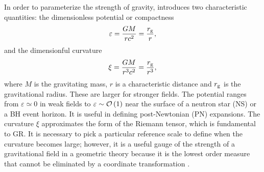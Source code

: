 In order to parameterize the strength of gravity, \citet{Psaltis2008a} introduces two characteristic quantities: the dimensionless potential or compactness \citep{Yunes2013}
\begin{equation}
\varepsilon = \dfrac{GM}{rc^2} = \dfrac{r_\mathrm{g}}{r},
\end{equation}
and the dimensionful curvature
\begin{equation}
\xi = \dfrac{GM}{r^3c^2} = \dfrac{r_\mathrm{g}}{r^3},
\end{equation}
where $M$ is the gravitating mass, $r$ is a characteristic distance and $r_\mathrm{g}$ is the gravitational radius. These are larger for stronger fields. The potential ranges from $\varepsilon \simeq 0$ in weak fields to $\varepsilon \sim \mathcal{O}\left({1}\right)$ near the surface of a neutron star (NS) or a BH event horizon. It is useful in defining post-Newtonian (PN) expansions. The curvature $\xi$ approximates the form of the Riemann tensor, which is fundamental to GR. It is necessary to pick a particular reference scale to define when the curvature becomes large; however, it is a useful gauge of the strength of a gravitational field in a geometric theory because it is the lowest order measure that cannot be eliminated by a coordinate transformation \citep[chapter 7]{Hobson2006}.

